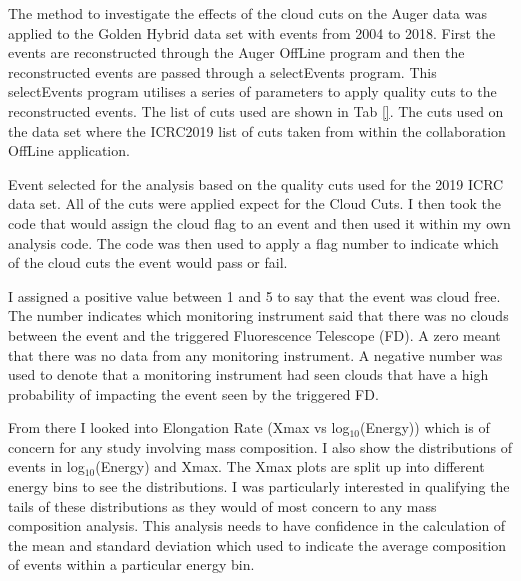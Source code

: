 %
%
%
%

The method to investigate the effects of the cloud cuts on the Auger data was applied to the Golden Hybrid data set with events from 2004 to 2018. First the events are reconstructed through the Auger OffLine program and then the reconstructed events are passed through a selectEvents program. This selectEvents program utilises a series of parameters to apply quality cuts to the reconstructed events. The list of cuts used are shown in Tab \ref{}. The cuts used on the data set where the ICRC2019 list of cuts taken from within the collaboration OffLine application.

Event selected for the analysis based on the quality cuts used for the 2019 ICRC data set. All of the cuts were applied expect for the Cloud Cuts. I then took the code that would assign the cloud flag to an event and then used it within my own analysis code. The code was then used to apply a flag number to indicate which of the cloud cuts the event would pass or fail.

I assigned a positive value between 1 and 5 to say that the event was cloud free. The number indicates which monitoring instrument said that there was no clouds between the event and the triggered Fluorescence Telescope (FD). A zero meant that there was no data from any monitoring instrument. A negative number was used to denote that a monitoring instrument had seen clouds that have a high probability of impacting the event seen by the triggered  FD.

From there I looked into Elongation Rate (Xmax vs log$_{10}$(Energy)) which is of concern for any study involving mass composition. I also show the distributions of events in log$_{10}$(Energy) and Xmax. The Xmax plots are split up into different energy bins to see the distributions. I was particularly interested in qualifying the tails of these distributions as they would of most concern to any mass composition analysis. This analysis needs to have confidence in the calculation of the mean and standard deviation which used to indicate the average composition of events within a particular energy bin. 

